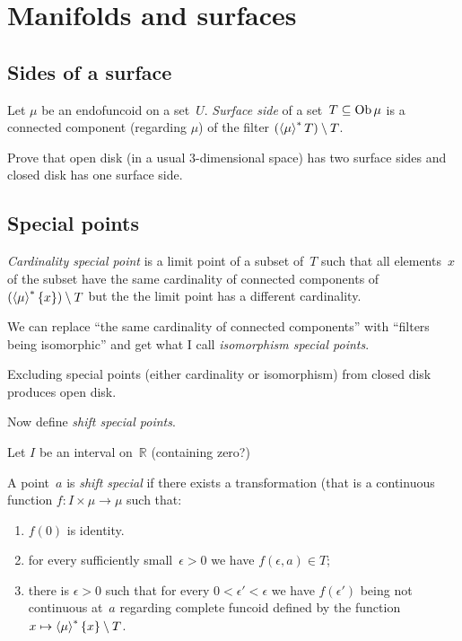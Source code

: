 \chapter{Manifolds and surfaces}

\section{Sides of a surface}

\begin{defn}
Let $\mu$ be an endofuncoid on a set~$U$.
\emph{Surface side} of a set~$T\subseteq\operatorname{Ob}\mu$ is a connected component
(regarding $\mu$) of the filter $(\left\langle \mu\right\rangle ^{\ast}T)\setminus T$.
\end{defn}

\begin{xca}
Prove that open disk (in a usual 3-dimensional space) has two surface sides
and closed disk has one surface side.
\end{xca}

\section{Special points}

\begin{defn}
\emph{Cardinality special point} is  a limit point of a subset of~$T$ such
that all elements~$x$ of the subset have the same cardinality of connected
components of $(\left\langle \mu\right\rangle ^{\ast}\{x\})\setminus T$ but the the limit point has
a different cardinality.
\end{defn}

We can replace ``the same cardinality of connected components'' with
``filters being isomorphic'' and get what I call
\emph{isomorphism special points}.

\begin{xca}
Excluding special points (either cardinality or isomorphism) from closed disk
produces open disk.
\end{xca}

Now define \emph{shift special points}.

Let $I$ be an interval on~$\mathbb{R}$ (containing zero?)

A point~$a$ is \emph{shift special} if there exists a transformation
(that is a continuous function $f:I\times\mu\to\mu$ such that:
\begin{enumerate}
  \item $f(0)$ is identity. 
  \item for every sufficiently small~$\epsilon>0$ we have $f(\epsilon,a)\in T$;
  \item there is $\epsilon>0$ such that for every $0<\epsilon'<\epsilon$ we have
    $f(\epsilon')$ being not continuous at~$a$ regarding complete funcoid
    defined by the function $x\mapsto\left\langle \mu\right\rangle ^{\ast}\{x\}\setminus T$.
\end{enumerate}

